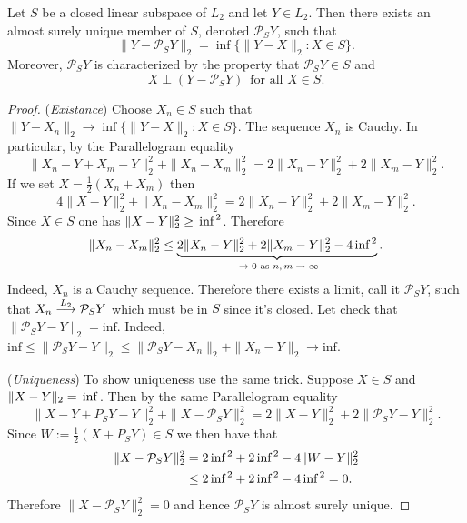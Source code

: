 \begin{theorem}
Let $S$ be a closed linear subspace of $L_2$ and let $Y\in L_2$. Then there exists an almost surely unique member of $S$, denoted $\mathcal P_S Y$, such that
\begin{equation}
\label{first char of proj}
\|Y - \mathcal P_S Y  \|_2 = \inf \{\|Y- X\|_2\colon X \in S  \}.
\end{equation}
Moreover, $\mathcal P_S Y$ is characterized by the property that $\mathcal P_S Y\in S$ and
\begin{equation}
\label{scnd char of proj}
X\perp (Y - \mathcal P_S Y )\,\text{ for all $X\in S$}. 
\end{equation}
\end{theorem}
\begin{proof}
({\sl Existance}) Choose $X_n\in S$ such that $\|Y-X_n\|_2\rightarrow \inf \{\|Y- X\|_2\colon X \in S  \}$. The sequence $X_n$ is Cauchy. In particular, by the Parallelogram equality 
\[ \|X_n-Y + X_m-Y \|_2^2 + \|X_n-X_m \|_2^2= 2\|X_n-Y  \|_2^2 + 2\| X_m-Y  \|_2^2.\]
If we set $X = \frac{1}{2}(X_n+X_m)$ then 
\[ 4\|X -Y \|_2^2 + \|X_n-X_m \|_2^2= 2\|X_n-Y  \|_2^2 + 2\| X_m-Y  \|_2^2.\]
 Since $X\in S$ one has  $\|X -Y \|_2^2\geq \text{\,inf\,}^2$. Therefore
\[  \|X_n-X_m \|_2^2 \leq \underbrace{ 2\|X_n-Y  \|_2^2 + 2\| X_m-Y  \|_2^2 - 4\text{\,inf\,}^2}_{\text{ $\rightarrow 0$ as $n,m \rightarrow \infty$}}. \]
Indeed, $X_n$ is a Cauchy sequence. Therefore there exists a limit, call it $\mathcal P_S Y$, such that   $X_n \overset{\small L_2} \longrightarrow \mathcal P_SY$ which must be in $S$ since it's closed. Let check that $\|\mathcal P_S Y - Y \|_2 = \text{inf}$. Indeed, $\text{inf}\leq \|\mathcal P_S Y - Y \|_2\leq \|\mathcal P_S Y - X_n \|_2+ \|X_n - Y\|_2 \rightarrow \text{inf}$.

({\sl Uniqueness}) To show uniqueness use the same trick. Suppose $X\in S$ and $\|X-Y\|_2 =  \text{\,inf\,}$. Then by the same Parallelogram equality 
\[ \|X-Y + P_S Y -Y \|_2^2 + \|X - \mathcal P_S Y \|_2^2= 2\|X - Y  \|_2^2 + 2\| \mathcal P_S Y - Y  \|_2^2.\]
Since $W := \frac{1}{2}(X+ P_S Y)\in S$ we then have that
\begin{align*}  
\|X - \mathcal P_S Y \|_2^2 
&=   2\text{\,inf\,}^2 +2\text{\,inf\,}^2 - 4\|W - Y \|_2^2  \\
&\leq  2\text{\,inf\,}^2 +2\text{\,inf\,}^2 - 4\text{\,inf\,}^2  = 0.
\end{align*}
Therefore $\|X - \mathcal P_S Y \|_2^2=0$ and hence $\mathcal P_S Y$ is almost surely unique.


\end{proof}
